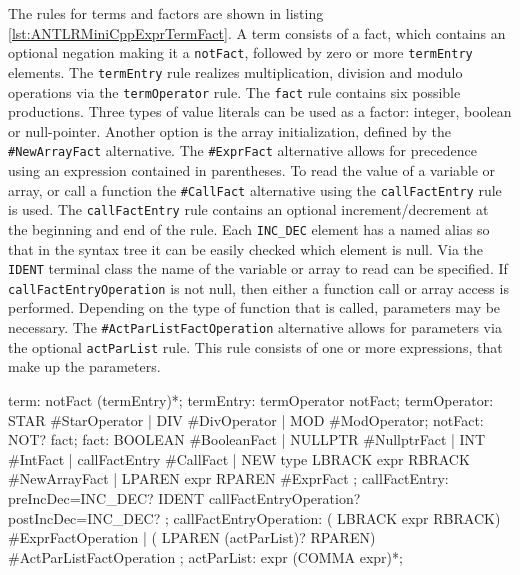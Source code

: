 The rules for terms and factors are shown in listing \ref{lst:ANTLRMiniCppExprTermFact}. A term consists of a fact, which contains an optional negation making it a \verb|notFact|, followed by zero or more \verb|termEntry| elements. The \verb|termEntry| rule realizes multiplication, division and modulo operations via the \verb|termOperator| rule. The \verb|fact| rule contains six possible productions. Three types of value literals can be used as a factor: integer, boolean or null-pointer. Another option is the array initialization, defined by the \verb|#NewArrayFact| alternative. The \verb|#ExprFact| alternative allows for precedence using an expression contained in parentheses. To read the value of a variable or array, or call a function the \verb|#CallFact| alternative using the \verb|callFactEntry| rule is used. The \verb|callFactEntry| rule contains an optional increment/decrement at the beginning and end of the rule. Each \verb|INC_DEC| element has a named alias so that in the syntax tree it can be easily checked which element is null. Via the \verb|IDENT| terminal class the name of the variable or array to read can be specified. If \verb|callFactEntryOperation| is not null, then either a function call or array access is performed. Depending on the type of function that is called, parameters may be necessary. The \verb|#ActParListFactOperation| alternative allows for parameters via the optional \verb|actParList| rule. This rule consists of one or more expressions, that make up the parameters.     

\begin{AntlrCode}[float,numbers=none,caption=Expression rules for terms and factors of the MiniC++ ANTLR grammar., label=lst:ANTLRMiniCppExprTermFact]
term:             notFact (termEntry)*;
termEntry:        termOperator notFact;
termOperator:     STAR #StarOperator
                | DIV #DivOperator
                | MOD #ModOperator;
notFact:          NOT? fact;
fact:             BOOLEAN #BooleanFact
                | NULLPTR #NullptrFact
                | INT     #IntFact
                | callFactEntry         #CallFact
                | NEW type LBRACK expr RBRACK #NewArrayFact
                | LPAREN expr RPAREN          #ExprFact
                ;
callFactEntry:    preIncDec=INC_DEC?
                  IDENT
                  callFactEntryOperation?
                  postIncDec=INC_DEC?
                  ;
callFactEntryOperation:
      ( LBRACK expr    RBRACK)          #ExprFactOperation
    | ( LPAREN (actParList)?    RPAREN) #ActParListFactOperation
    ;
actParList:       expr (COMMA expr)*;
\end{AntlrCode}

